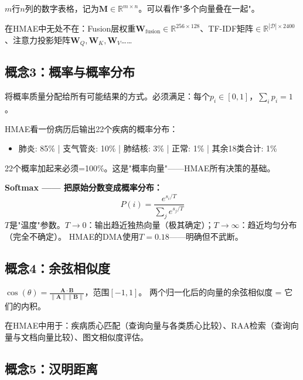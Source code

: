 \documentclass[11pt,a4paper]{ctexart}
\begin{document}
\begin{defbox}[矩阵 (Matrix)]
$m$行$n$列的数字表格，记为$\mathbf{M} \in \mathbb{R}^{m \times n}$。可以看作"多个向量叠在一起"。
\end{defbox}

在HMAE中无处不在：Fusion层权重$\mathbf{W}_{\text{fusion}} \in \mathbb{R}^{256 \times 128}$、TF-IDF矩阵$\in \mathbb{R}^{|\mathcal{D}| \times 2400}$、注意力投影矩阵$\mathbf{W}_Q, \mathbf{W}_K, \mathbf{W}_V$……

\subsection{概念3：概率与概率分布}

\begin{defbox}
将概率质量分配给所有可能结果的方式。必须满足：每个$p_i \in [0, 1]$，$\sum_i p_i = 1$。
\end{defbox}

\begin{exambox}[例子：诊断概率分布]
HMAE看一份病历后输出22个疾病的概率分布：
\begin{itemize}[nosep]
\item 肺炎: 85\% | 支气管炎: 10\% | 肺结核: 3\% | 正常: 1\% | 其余18类合计: 1\%
\end{itemize}
22个概率加起来必须=100\%。这是"概率向量"——HMAE所有决策的基础。
\end{exambox}

\textbf{Softmax —— 把原始分数变成概率分布：}
$$P(i) = \frac{e^{s_i / T}}{\sum_j e^{s_j / T}}$$
$T$是"温度"参数。$T \to 0$：输出趋近独热向量（极其确定）；$T \to \infty$：趋近均匀分布（完全不确定）。
HMAE的DMA使用$T=0.18$——明确但不武断。

\subsection{概念4：余弦相似度}

\begin{defbox}
$\cos(\theta) = \frac{\mathbf{A} \cdot \mathbf{B}}{\|\mathbf{A}\| \|\mathbf{B}\|}$，范围$[-1, 1]$。
两个归一化后的向量的余弦相似度 = 它们的内积。
\end{defbox}

在HMAE中用于：疾病质心匹配（查询向量与各类质心比较）、RAA检索（查询向量与文档向量比较）、图文相似度评估。

\subsection{概念5：汉明距离}
\end{document}
